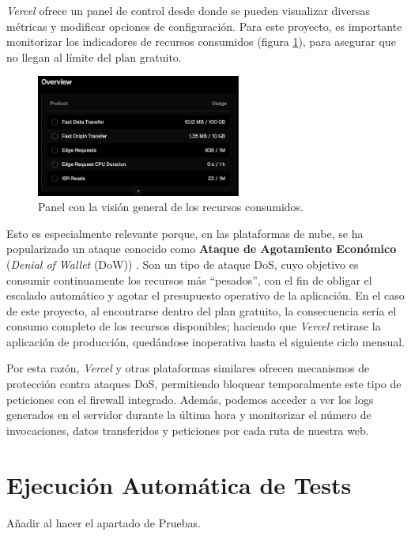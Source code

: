 \textit{Vercel} ofrece un panel de control desde donde se pueden visualizar diversas métricas y modificar opciones de configuración. Para este proyecto, es importante monitorizar los indicadores de recursos consumidos (figura \ref{fig:usage_overview}), para asegurar que no llegan al límite del plan gratuito.

\begin{figure}[H]
    \centering
    \includegraphics[width=0.6\textwidth]{figures/despliegue/usage_overview.png}
    \caption{Panel con la visión general de los recursos consumidos.}
    \label{fig:usage_overview}
\end{figure}

\newpage

Esto es especialmente relevante porque, en las plataformas de nube, se ha popularizado un ataque conocido como \textbf{Ataque de Agotamiento Económico} (\textit{Denial of Wallet} (DoW)) \cite{vercelDoW2025}. Son un tipo de ataque DoS, cuyo objetivo es consumir continuamente los recursos más ``pesados'', con el fin de obligar el escalado automático y agotar el presupuesto operativo de la aplicación. En el caso de este proyecto, al encontrarse dentro del plan gratuito, la consecuencia sería el consumo completo de los recursos disponibles; haciendo que \textit{Vercel} retirase la aplicación de producción, quedándose inoperativa hasta el siguiente ciclo mensual.

Por esta razón, \textit{Vercel} y otras plataformas similares ofrecen mecanismos de protección contra ataques DoS, permitiendo bloquear temporalmente este tipo de peticiones con el firewall integrado. Además, podemos acceder a ver los logs generados en el servidor durante la última hora y monitorizar el número de invocaciones, datos transferidos y peticiones por cada ruta de nuestra web.

\section{Ejecución Automática de Tests} \label{sec:test_automaticos}
Añadir al hacer el apartado de Pruebas.

